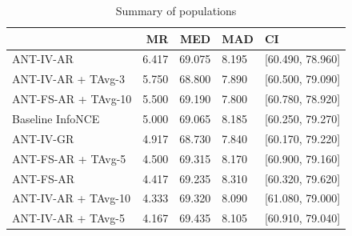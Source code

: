 \begin{table}[h]
\centering
\begin{tabular}{lrrll}
\toprule
 & MR & MED & MAD & CI \\
\midrule
ANT-IV-AR & 6.417 & 69.075 & 8.195 & [60.490, 78.960] \\
ANT-IV-AR + TAvg-3 & 5.750 & 68.800 & 7.890 & [60.500, 79.090] \\
ANT-FS-AR + TAvg-10 & 5.500 & 69.190 & 7.800 & [60.780, 78.920] \\
Baseline InfoNCE & 5.000 & 69.065 & 8.185 & [60.250, 79.270] \\
ANT-IV-GR & 4.917 & 68.730 & 7.840 & [60.170, 79.220] \\
ANT-FS-AR + TAvg-5 & 4.500 & 69.315 & 8.170 & [60.900, 79.160] \\
ANT-FS-AR & 4.417 & 69.235 & 8.310 & [60.320, 79.620] \\
ANT-IV-AR + TAvg-10 & 4.333 & 69.320 & 8.090 & [61.080, 79.000] \\
ANT-IV-AR + TAvg-5 & 4.167 & 69.435 & 8.105 & [60.910, 79.040] \\
\bottomrule
\end{tabular}
\caption{Summary of populations}
\label{tbl:stat_results}
\end{table}
